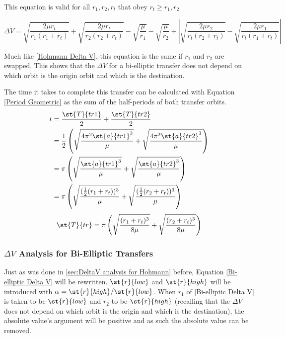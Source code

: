 \documentclass[../basicOrbitalDynamics.tex]{subfiles}
\begin{document}
This equation is valid for all $r_1, r_2, r_t$ that obey $r_t\geq r_1,r_2$

\begin{equation}\label{Bi-elliptic Delta V}
    \Delta V = \sqrt{\frac{2\mu r_t}{r_1(r_1+r_t)}}+\sqrt{\frac{2\mu r_t}{r_2(r_2+r_t)}}-\sqrt{\frac{\mu}{r_1}}-\sqrt{\frac{\mu}{r_2}}+\left|\sqrt{\frac{2\mu r_2}{r_t(r_2+r_t)}}-\sqrt{\frac{2\mu r_1}{r_t(r_1+r_t)}}\right|
\end{equation}

Much like \eqref{Hohmann Delta V}, this equation is the same if $r_1$ and $r_2$ are swapped. This shows that the $\Delta V$ for a bi-elliptic transfer does not depend on which orbit is the origin orbit and which is the destination.

The time it takes to complete this transfer can be calculated with Equation \eqref{Period Geometric} as the sum of the half-periods of both transfer orbits.
\begin{align*}
    t &=\frac{\st{T}{tr1}}{2}+\frac{\st{T}{tr2}}{2} \\
 &=\frac{1}{2}\left(\sqrt{\frac{4\pi^2 \st{a}{tr1}^3}{\mu}}+\sqrt{\frac{4\pi^2 \st{a}{tr2}^3}{\mu}}\right) \\
 &=\pi\left(\sqrt{\frac{\st{a}{tr1}^3}{\mu}}+\sqrt{\frac{\st{a}{tr2}^3}{\mu}}\right) \\
 &=\pi\left(\sqrt{\frac{(\frac{1}{2}(r_1+r_t))^3}{\mu}}+\sqrt{\frac{(\frac{1}{2}(r_2+r_t))^3}{\mu}}\right) \\
\end{align*}
\begin{equation}\label{Bielliptic time}
    \st{T}{tr}=\pi\left(\sqrt{\frac{(r_1+r_t)^3}{8\mu}}+\sqrt{\frac{(r_2+r_t)^3}{8\mu}}\right)
\end{equation}

\subsubsection{\texorpdfstring{$\Delta V$}{DeltaV} Analysis for Bi-Elliptic Transfers}\label{sec:DeltaV Analsysis for bi-elliptic}

Just as was done in \ref{sec:DeltaV analysis for Hohmann} before, Equation \eqref{Bi-elliptic Delta V} will be rewritten. $\st{r}{low}$ and $\st{r}{high}$ will be introduced with $\alpha=\st{r}{high}/\st{r}{low}$. When $r_1$ of \eqref{Bi-elliptic Delta V} is taken to be $\st{r}{low}$ and $r_2$ to be $\st{r}{high}$ (recalling that the $\Delta V$ does not depend on which orbit is the origin and which is the destination), the absolute value's argument will be positive and as such the absolute value can be removed.
\end{document}
